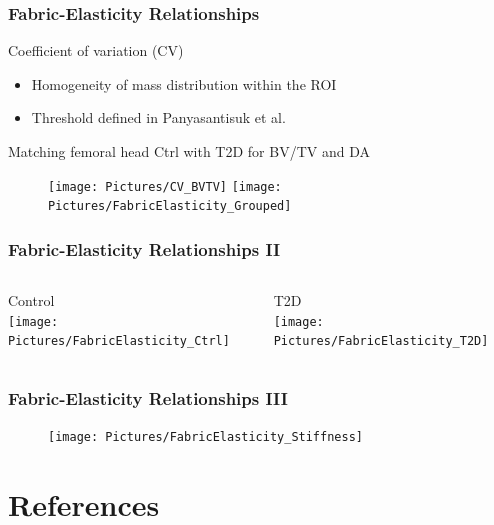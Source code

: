 \documentclass[xcolor=table,11pt]{beamer}
\begin{document}
	\begin{frame}
		\frametitle{Fabric-Elasticity Relationships}
		Coefficient of variation (CV)
		\begin{itemize}
			\item Homogeneity of mass distribution within the ROI
			\item Threshold defined in Panyasantisuk et al. \cite{p1}
		\end{itemize}
		Matching femoral head Ctrl with T2D for BV/TV and DA \cite{p2}
		\begin{figure}
			\centering
			\texttt{[image: Pictures/CV\_BVTV]}
			\texttt{[image: Pictures/FabricElasticity\_Grouped]}
		\end{figure}
	\end{frame}

	\begin{frame}
		\frametitle{Fabric-Elasticity Relationships II}
		\begin{columns}
			\column[t]{0.45\linewidth}
			\centering
			Control\\
			\texttt{[image: Pictures/FabricElasticity\_Ctrl]}
				
			\column[t]{0.45\linewidth}
			\centering
			T2D\\
			\texttt{[image: Pictures/FabricElasticity\_T2D]}
		\end{columns}
	\end{frame}

	\begin{frame}
		\frametitle{Fabric-Elasticity Relationships III}
		\begin{figure}
			\centering
			\texttt{[image: Pictures/FabricElasticity\_Stiffness]}
		\end{figure}
	\end{frame}
		

	\section{References}
\end{document}
